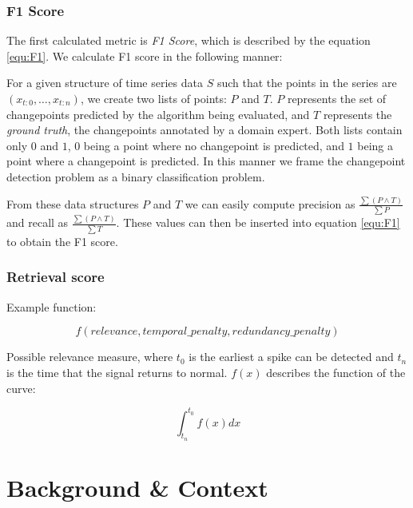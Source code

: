 \documentclass{uvamscse}	%
\begin{document}
\subsection{F1 Score}

The first calculated metric is \emph{F1 Score}, which is described by the equation \ref{equ:F1}. We calculate F1 score in the following manner:

For a given structure of time series data $S$ such that the points in the series are $(x_{t:0},\ldots,x_{t:n})$, we create two lists of points: $P$ and $T$. $P$ represents the set of changepoints predicted by the algorithm being evaluated, and $T$ represents the \emph{ground truth}, the changepoints annotated by a domain expert. Both lists contain only $0$ and $1$, $0$ being a point where no changepoint is predicted, and $1$ being a point where a changepoint is predicted. In this manner we frame the changepoint detection problem as a binary classification problem.

From these data structures $P$ and $T$ we can easily compute precision as $\frac{\sum (P \wedge T) }{\sum P}$ and recall as $\frac{\sum (P \wedge T)}{\sum T}$. These values can then be inserted into equation \ref{equ:F1} to obtain the F1 score.

\subsection{Retrieval score}

Example function:

\begin{equation}
	f(relevance, temporal\_penalty, redundancy\_penalty)
\end{equation}


Possible relevance measure, where $t_0$ is the earliest a spike can be detected and $t_n$ is the time that the signal returns to normal. $f(x)$ describes the function of the curve:

\begin{equation}
	\int^{t_0}_{t_n} f(x) dx
\end{equation}

\chapter{Background \& Context}
\end{document}
